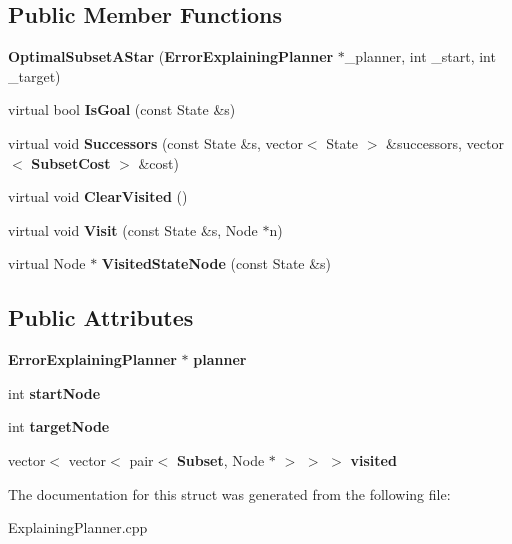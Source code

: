 \subsection*{Public Member Functions}
\begin{DoxyCompactItemize}
\item 
{\bfseries Optimal\+Subset\+A\+Star} ({\bf Error\+Explaining\+Planner} $\ast$\+\_\+planner, int \+\_\+start, int \+\_\+target)\label{structOptimalSubsetAStar_afd6df9310a118c2fcb90b58a53fc1f9f}

\item 
virtual bool {\bfseries Is\+Goal} (const State \&s)\label{structOptimalSubsetAStar_a8b6a6fb65356d468293218231bb97c26}

\item 
virtual void {\bfseries Successors} (const State \&s, vector$<$ State $>$ \&successors, vector$<$ {\bf Subset\+Cost} $>$ \&cost)\label{structOptimalSubsetAStar_a4538406b36aaa88f5263d659aa8ee293}

\item 
virtual void {\bfseries Clear\+Visited} ()\label{structOptimalSubsetAStar_a680ff03bd25a991834a44ca301045305}

\item 
virtual void {\bfseries Visit} (const State \&s, Node $\ast$n)\label{structOptimalSubsetAStar_a724d3445f40d0a6e1986137b4bc2ca51}

\item 
virtual Node $\ast$ {\bfseries Visited\+State\+Node} (const State \&s)\label{structOptimalSubsetAStar_a9f526192902fd48d57c0de1662727116}

\end{DoxyCompactItemize}
\subsection*{Public Attributes}
\begin{DoxyCompactItemize}
\item 
{\bf Error\+Explaining\+Planner} $\ast$ {\bfseries planner}\label{structOptimalSubsetAStar_a5bb51a35a94f0af9c266139c687fdf4e}

\item 
int {\bfseries start\+Node}\label{structOptimalSubsetAStar_ac7871f90cd6594a08b7667a1579b2908}

\item 
int {\bfseries target\+Node}\label{structOptimalSubsetAStar_a36443ceb5144056c4dacbc7bb4f6eb46}

\item 
vector$<$ vector$<$ pair$<$ {\bf Subset}, Node $\ast$ $>$ $>$ $>$ {\bfseries visited}\label{structOptimalSubsetAStar_a1558e620e3187a163f2389684efafa81}

\end{DoxyCompactItemize}


The documentation for this struct was generated from the following file\+:\begin{DoxyCompactItemize}
\item 
Explaining\+Planner.\+cpp\end{DoxyCompactItemize}
